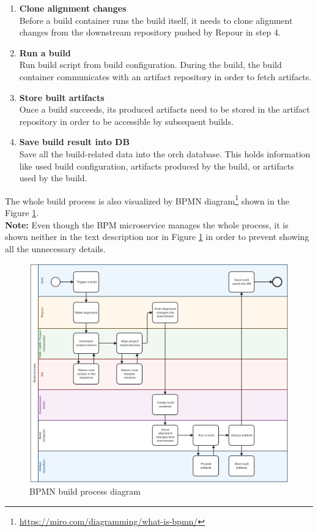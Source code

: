 \documentclass[../main.tex]{subfiles}
\begin{document}
\begin{enumerate}
    \item \textbf{Clone alignment changes}\\
    Before a build container runs the build itself, it needs to clone alignment changes from the downstream repository pushed by Repour in step 4.

    \item \textbf{Run a build}\\
    Run build script from build configuration. During the build, the build container communicates with an artifact repository in order to fetch artifacts.

    \item \textbf{Store built artifacts}\\
    Once a build succeeds, its produced artifacts need to be stored in the artifact repository in order to be accessible by subsequent builds.

    \item \textbf{Save build result into DB}\\
    Save all the build-related data into the orch database. This holds information like used build configuration, artifacts produced by the build, or artifacts used by the build.
    
\end{enumerate}

The whole build process is also visualized by BPMN diagram\footnote{\url{https://miro.com/diagramming/what-is-bpmn/}} shown in the Figure \ref{fig:build-process-bpmn}.\\
\textbf{Note:} Even though the BPM microservice manages the whole process, it is shown neither in the text description nor in Figure \ref{fig:build-process-bpmn} in order to prevent showing all the unnecessary details.

\begin{figure}
  \begin{center}
    \includegraphics[width=\textwidth]{images/build-process-bpmn.png}
  \end{center}
  \caption{BPMN build process diagram}
  \label{fig:build-process-bpmn}
\end{figure}
\end{document}
